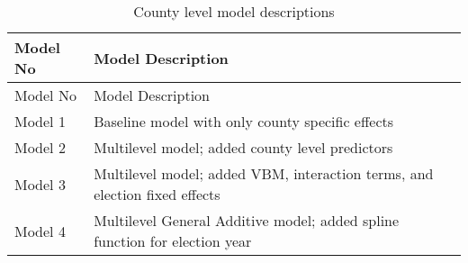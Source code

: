 \documentclass[12pt,twoside]{reedthesis}
\begin{document}
  \begin{longtable}[]{@{}ll@{}}
  \caption{County level model descriptions
  \label{tab:model_desc_county}}\tabularnewline
  \toprule
  \begin{minipage}[b]{0.15\columnwidth}\raggedright\strut
  Model No\strut
  \end{minipage} & \begin{minipage}[b]{0.80\columnwidth}\raggedright\strut
  Model Description\strut
  \end{minipage}\tabularnewline
  \midrule
  \endfirsthead
  \toprule
  \begin{minipage}[b]{0.15\columnwidth}\raggedright\strut
  Model No\strut
  \end{minipage} & \begin{minipage}[b]{0.80\columnwidth}\raggedright\strut
  Model Description\strut
  \end{minipage}\tabularnewline
  \midrule
  \endhead
  \begin{minipage}[t]{0.15\columnwidth}\raggedright\strut
  Model 1\strut
  \end{minipage} & \begin{minipage}[t]{0.80\columnwidth}\raggedright\strut
  Baseline model with only county specific effects\strut
  \end{minipage}\tabularnewline
  \begin{minipage}[t]{0.15\columnwidth}\raggedright\strut
  Model 2\strut
  \end{minipage} & \begin{minipage}[t]{0.80\columnwidth}\raggedright\strut
  Multilevel model; added county level predictors\strut
  \end{minipage}\tabularnewline
  \begin{minipage}[t]{0.15\columnwidth}\raggedright\strut
  Model 3\strut
  \end{minipage} & \begin{minipage}[t]{0.80\columnwidth}\raggedright\strut
  Multilevel model; added VBM, interaction terms, and election fixed
  effects\strut
  \end{minipage}\tabularnewline
  \begin{minipage}[t]{0.15\columnwidth}\raggedright\strut
  Model 4\strut
  \end{minipage} & \begin{minipage}[t]{0.80\columnwidth}\raggedright\strut
  Multilevel General Additive model; added spline function for election
  year\strut
  \end{minipage}\tabularnewline
  \bottomrule
  \end{longtable}
  
\end{document}
